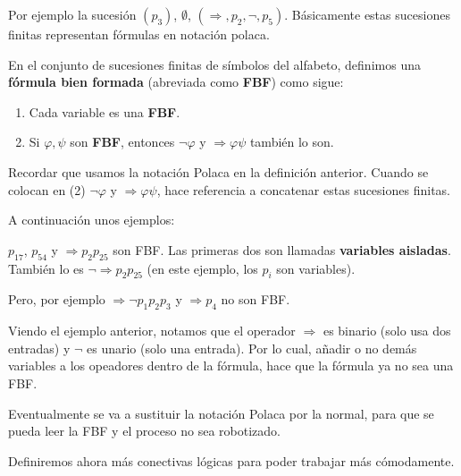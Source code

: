 \documentclass[12pt]{report}
\newcounter{it}
\theoremstyle{largebreak}
\begin{document}
    \begin{exa}
        Por ejemplo la sucesión $(p_3)$, $\emptyset$, $(\Rightarrow, p_2,\neg,p_5)$. Básicamente estas sucesiones finitas representan fórmulas en notación polaca.
    \end{exa}

    \begin{mydef}
        En el conjunto de sucesiones finitas de símbolos del alfabeto, definimos una \textbf{fórmula bien formada} (abreviada como \textbf{FBF}) como sigue:
        \begin{enumerate}
            \item Cada variable es una \textbf{FBF}.
            \item Si $\varphi,\psi$ son \textbf{FBF}, entonces $\neg\varphi$ y $\Rightarrow\varphi\psi$ también lo son.
        \end{enumerate}
    \end{mydef}

    \begin{obs}
        Recordar que usamos la notación Polaca en la definición anterior. Cuando se colocan en (2) $\neg\varphi$ y $\Rightarrow\varphi\psi$, hace referencia a concatenar estas sucesiones finitas.
    \end{obs}

    A continuación unos ejemplos:
    
    \begin{exa}
        $p_{17}$, $p_{54}$ y $\Rightarrow p_2p_{25}$ son FBF. Las primeras dos son llamadas \textbf{variables aisladas}. También lo es $\neg \Rightarrow p_2p_{25}$ (en este ejemplo, los $p_i$ son variables).

        Pero, por ejemplo $\Rightarrow \neg p_1 p_2 p_3$ y $\Rightarrow p_4$ no son FBF.
    \end{exa}

    Viendo el ejemplo anterior, notamos que el operador $\Rightarrow$ es binario (solo usa dos entradas) y $\neg$ es unario (solo una entrada). Por lo cual, añadir o no demás variables a los opeadores dentro de la fórmula, hace que la fórmula ya no sea una FBF.

    \begin{obs}
        Eventualmente se va a sustituir la notación Polaca por la normal, para que se pueda leer la FBF y el proceso no sea robotizado.
    \end{obs}

    Definiremos ahora más conectivas lógicas para poder trabajar más cómodamente.
\end{document}

